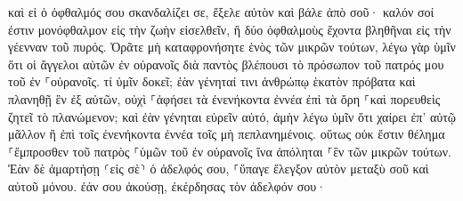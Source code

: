 \documentclass{openreader}
\begin{document}
καὶ εἰ ὁ ὀφθαλμός σου σκανδαλίζει σε, ἔξελε αὐτὸν καὶ βάλε ἀπὸ σοῦ· καλόν σοί ἐστιν μονόφθαλμον εἰς τὴν ζωὴν εἰσελθεῖν, ἢ δύο ὀφθαλμοὺς ἔχοντα βληθῆναι εἰς τὴν γέενναν τοῦ πυρός. 
Ὁρᾶτε μὴ καταφρονήσητε ἑνὸς τῶν μικρῶν τούτων, λέγω γὰρ ὑμῖν ὅτι οἱ ἄγγελοι αὐτῶν ἐν οὐρανοῖς διὰ παντὸς βλέπουσι τὸ πρόσωπον τοῦ πατρός μου τοῦ ἐν ⸀οὐρανοῖς. 
τί ὑμῖν δοκεῖ; ἐὰν γένηταί τινι ἀνθρώπῳ ἑκατὸν πρόβατα καὶ πλανηθῇ ἓν ἐξ αὐτῶν, οὐχὶ ⸀ἀφήσει τὰ ἐνενήκοντα ἐννέα ἐπὶ τὰ ὄρη ⸀καὶ πορευθεὶς ζητεῖ τὸ πλανώμενον; 
καὶ ἐὰν γένηται εὑρεῖν αὐτό, ἀμὴν λέγω ὑμῖν ὅτι χαίρει ἐπ’ αὐτῷ μᾶλλον ἢ ἐπὶ τοῖς ἐνενήκοντα ἐννέα τοῖς μὴ πεπλανημένοις. 
οὕτως οὐκ ἔστιν θέλημα ⸀ἔμπροσθεν τοῦ πατρὸς ⸀ὑμῶν τοῦ ἐν οὐρανοῖς ἵνα ἀπόληται ⸀ἓν τῶν μικρῶν τούτων. 
Ἐὰν δὲ ἁμαρτήσῃ ⸂εἰς σὲ⸃ ὁ ἀδελφός σου, ⸀ὕπαγε ἔλεγξον αὐτὸν μεταξὺ σοῦ καὶ αὐτοῦ μόνου. ἐάν σου ἀκούσῃ, ἐκέρδησας τὸν ἀδελφόν σου· 
\end{document}
